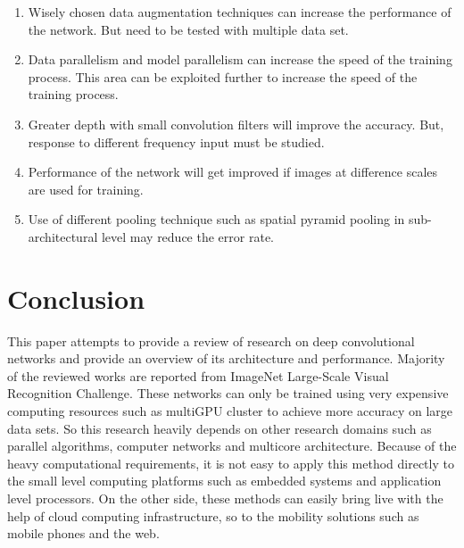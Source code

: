 \documentclass{llncs}
\begin{document}
 \begin{enumerate}
 \itemsep0em 
 \item  Wisely chosen data  augmentation techniques can increase the performance of the network. But need to be tested with multiple data set.
 \item Data parallelism and model parallelism can increase the speed of the training process. This area can be exploited further to increase the speed of the training process.
 \item Greater depth with small convolution filters will improve the accuracy. But, response to different frequency input must be studied.
 \item Performance of the network will get improved if images at difference scales are used for training.
 \item Use of different pooling technique such as spatial pyramid pooling in sub-architectural level may reduce the error rate. 
 \end{enumerate}
 
 

\vspace*{-7mm}
\section{Conclusion}
\vspace*{-3mm}
This paper attempts to provide a  review of research on deep convolutional networks  and provide an overview of  its architecture and performance. Majority of the reviewed  works are reported from ImageNet Large-Scale Visual Recognition Challenge. These networks can only be trained using very expensive computing resources such as multiGPU cluster  to achieve more accuracy on large data sets. So  this research heavily depends on other research domains such as parallel algorithms, computer networks and multicore architecture. Because of the heavy computational requirements, it is not easy to apply this method directly  to the small level computing platforms such as embedded systems and application level  processors. On the other side, these methods can easily bring  live with the help of  cloud computing infrastructure, so to the mobility solutions such as mobile phones and the web.
\vspace*{-5mm}


\end{document}
